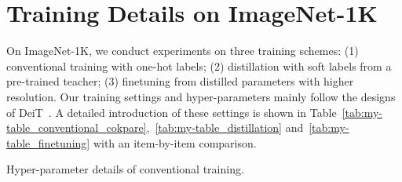 \documentclass[runningheads]{llncs}
\begin{document}
	\section{Training Details on ImageNet-1K} \label{training_details}
	
	On ImageNet-1K, we conduct experiments on three training schemes: (1) conventional training with one-hot labels; (2) distillation with soft labels from a pre-trained teacher; (3) finetuning from distilled parameters with higher resolution. Our training settings and hyper-parameters mainly follow the designs of DeiT~\cite{touvron2020training}. A detailed introduction of these settings is shown in Table~\ref{tab:my-table_conventional_cokpare},~\ref{tab:my-table_distillation} and~\ref{tab:my-table_finetuning} with an item-by-item comparison. 
	
	\begin{table}[t]
		\centering
		\begin{minipage}{0.43\textwidth}
			\centering
			\caption{Hyper-parameter details of conventional training.}
			\label{tab:my-table_conventional_cokpare}
		\end{minipage}
\hspace{0.1in}
		\begin{minipage}{0.47\textwidth}
			\centering
			\small
			\setlength{\tabcolsep}{2pt}
\centering
			\caption{Hyper-parameter  details of soft distillation training.}
			\label{tab:my-table_distillation}
\end{minipage}
\end{table}
\end{document}
